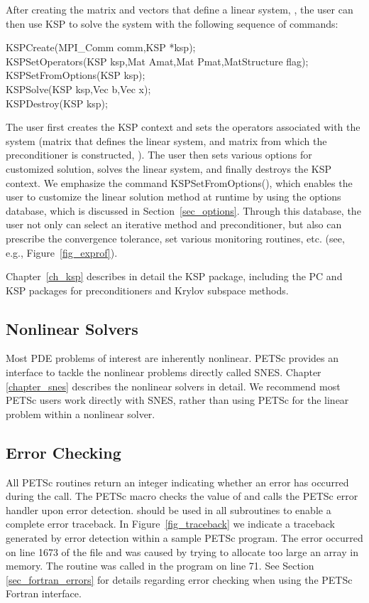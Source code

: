 After creating the matrix and vectors that define a linear system,
, the user can then use KSP to solve the system
with the following sequence of commands:
\begin{tabbing}
  KSPCreate(MPI\_Comm comm,KSP *ksp); \\
  KSPSetOperators(KSP ksp,Mat Amat,Mat Pmat,MatStructure flag);\\
  KSPSetFromOptions(KSP ksp);\\
  KSPSolve(KSP ksp,Vec b,Vec x);\\
  KSPDestroy(KSP ksp);
\end{tabbing}
The user first creates the KSP context and sets the operators
associated with the system (matrix that defines the linear system,  and matrix from which the 
preconditioner is constructed, ).  The user then sets various options for
customized solution, solves the linear system, and finally destroys
the KSP context.  We emphasize the command KSPSetFromOptions(),
which enables the user to customize the linear solution
method at runtime by using the options database, which is discussed in
Section~\ref{sec_options}. Through this database, the user not only
can select an iterative method and preconditioner, but also can prescribe
the convergence tolerance, set various monitoring routines, etc.
(see, e.g., Figure~\ref{fig_exprof}).

Chapter~\ref{ch_ksp} describes in detail the KSP package, including
the PC and KSP packages for preconditioners and Krylov subspace methods.

\subsection*{Nonlinear Solvers}
Most PDE problems of interest are inherently nonlinear. PETSc provides
an interface to tackle the nonlinear problems directly called SNES. Chapter
\ref{chapter_snes} describes the nonlinear solvers in detail. We recommend
most PETSc users work directly with SNES, rather than using PETSc
for the linear problem within a nonlinear solver.

\subsection*{Error Checking}

All PETSc routines return an integer indicating whether an error
has occurred during the call.  The PETSc macro 
checks the value of  and calls the PETSc error handler
upon error detection.   should be used in all
subroutines to enable a complete error traceback.
In Figure~\ref{fig_traceback} we indicate a
traceback generated by error detection within a sample PETSc
program. The error occurred on line 1673 of the file  and was caused by trying to allocate too
large an array in memory. The routine was called in the program
 on line 71.  See Section \ref{sec_fortran_errors} for
details regarding error checking when using the PETSc Fortran interface.

